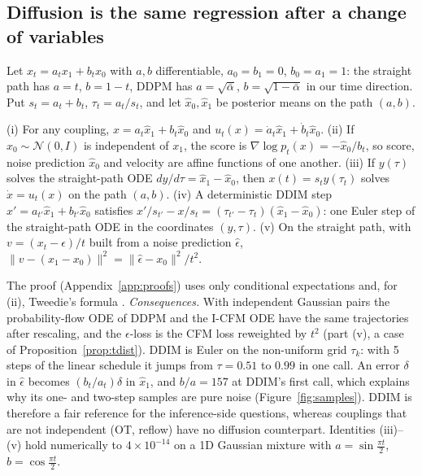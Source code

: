 \subsection{Diffusion is the same regression after a change of variables}\label{sec:diffusion}
Let $x_t=a_tx_1+b_tx_0$ with $a,b$ differentiable, $a_0=b_1=0$, $b_0=a_1=1$: the straight path has $a=t$, $b=1-t$, DDPM \citep{ho2020ddpm} has $a=\sqrt{\bar\alpha}$, $b=\sqrt{1-\bar\alpha}$ in our time direction. Put $s_t=a_t+b_t$, $\tau_t=a_t/s_t$, and let $\hat x_0,\hat x_1$ be posterior means on the path $(a,b)$.
\begin{proposition}\label{prop:d9}
(i) For any coupling, $x=a_t\hat x_1+b_t\hat x_0$ and $u_t(x)=\dot a_t\hat x_1+\dot b_t\hat x_0$.
(ii) If $x_0\sim\mathcal N(0,I)$ is independent of $x_1$, the score is $\nabla\log p_t(x)=-\hat x_0/b_t$, so score, noise prediction $\hat x_0$ and velocity are affine functions of one another.
(iii) If $y(\tau)$ solves the straight-path ODE $dy/d\tau=\hat x_1-\hat x_0$, then $x(t)=s_ty(\tau_t)$ solves $\dot x=u_t(x)$ on the path $(a,b)$.
(iv) A deterministic DDIM step $x'=a_{t'}\hat x_1+b_{t'}\hat x_0$ \citep{song2021ddim} satisfies $x'/s_{t'}-x/s_t=(\tau_{t'}-\tau_t)(\hat x_1-\hat x_0)$: one Euler step of the straight-path ODE in the coordinates $(y,\tau)$.
(v) On the straight path, with $v=(x_t-\hat\epsilon)/t$ built from a noise prediction $\hat\epsilon$, $\|v-(x_1-x_0)\|^2=\|\hat\epsilon-x_0\|^2/t^2$.
\end{proposition}
The proof (Appendix~\ref{app:proofs}) uses only conditional expectations and, for (ii), Tweedie's formula \citep{efron2011tweedie}. \emph{Consequences.} With independent Gaussian pairs the probability-flow ODE of DDPM \citep{song2021sde} and the I-CFM ODE have the same trajectories after rescaling, and the $\epsilon$-loss is the CFM loss reweighted by $t^2$ (part (v), a case of Proposition~\ref{prop:tdist}). DDIM is Euler on the non-uniform grid $\tau_k$: with 5 steps of the linear schedule it jumps from $\tau=0.51$ to $0.99$ in one call. An error $\delta$ in $\hat\epsilon$ becomes $(b_t/a_t)\delta$ in $\hat x_1$, and $b/a=157$ at DDIM's first call, which explains why its one- and two-step samples are pure noise (Figure~\ref{fig:samples}). DDIM is therefore a fair reference for the inference-side questions, whereas couplings that are not independent (OT, reflow) have no diffusion counterpart. Identities (iii)--(v) hold numerically to $4\times10^{-14}$ on a 1D Gaussian mixture with $a=\sin\frac{\pi t}{2}$, $b=\cos\frac{\pi t}{2}$.

